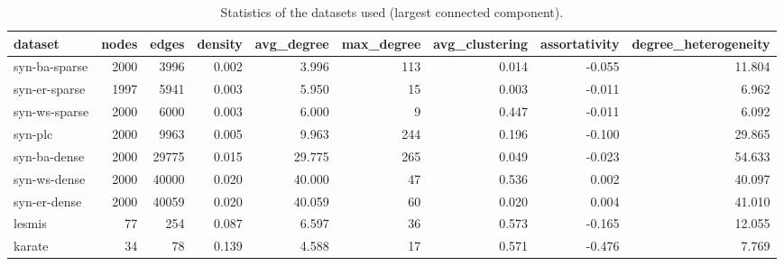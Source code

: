 \begin{table}[t]
\centering
\caption{Statistics of the datasets used (largest connected component).}
\label{tab:table1_graph_stats}
\begin{tabular}{lrrrrrrrr}
\hline
dataset & nodes & edges & density & avg\_degree & max\_degree & avg\_clustering & assortativity & degree\_heterogeneity \\
\hline
syn-ba-sparse & 2000 & 3996 & 0.002 & 3.996 & 113 & 0.014 & -0.055 & 11.804 \\
syn-er-sparse & 1997 & 5941 & 0.003 & 5.950 & 15 & 0.003 & -0.011 & 6.962 \\
syn-ws-sparse & 2000 & 6000 & 0.003 & 6.000 & 9 & 0.447 & -0.011 & 6.092 \\
syn-plc & 2000 & 9963 & 0.005 & 9.963 & 244 & 0.196 & -0.100 & 29.865 \\
syn-ba-dense & 2000 & 29775 & 0.015 & 29.775 & 265 & 0.049 & -0.023 & 54.633 \\
syn-ws-dense & 2000 & 40000 & 0.020 & 40.000 & 47 & 0.536 & 0.002 & 40.097 \\
syn-er-dense & 2000 & 40059 & 0.020 & 40.059 & 60 & 0.020 & 0.004 & 41.010 \\
lesmis & 77 & 254 & 0.087 & 6.597 & 36 & 0.573 & -0.165 & 12.055 \\
karate & 34 & 78 & 0.139 & 4.588 & 17 & 0.571 & -0.476 & 7.769 \\
\hline
\end{tabular}
\end{table}